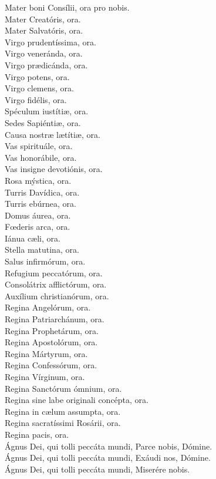 \documentclass[10pt,a4paper,oneside]{book}
\begin{document}
\begin{minipage}[t]{0.475\textwidth}
    Mater boni Consílii, ora pro nobis.\\
    Mater Creatóris, ora.\\
    Mater Salvatóris, ora.\\
    Virgo prudentíssima, ora.\\
    Virgo veneránda, ora.\\
    Virgo pr{\ae}dicánda, ora.\\
    Virgo potens, ora.\\
    Virgo clemens, ora.\\
    Virgo fidélis, ora.\\
    Spéculum iustíti{\ae}, ora.\\
    Sedes Sapiénti{\ae}, ora.\\
    Causa nostr{\ae} l{\ae}títi{\ae}, ora.\\
    Vas spirituále, ora.\\
    Vas honorábile, ora.\\
    Vas insigne devotiónis, ora.\\
    Rosa mýstica, ora.\\
    Turris Davídica, ora.\\
    Turris ebúrnea, ora.\\
    Domus áurea, ora.\\
    F{\oe}deris arca, ora.\\
    Iánua c{\ae}li, ora.\\
    Stella matutina, ora.\\
    Salus infirmórum, ora.\\
    Refugium peccatórum, ora.\\
    Consolátrix afflictórum, ora.\\
    Auxílium christianórum, ora.\\
    Regina Angelórum, ora.\\
    Regina Patriarchánum, ora.\\
    Regina Prophetárum, ora.\\
    Regina Apostolórum, ora.\\
    Regina Mártyrum, ora.\\
    Regina Confessórum, ora.\\
    Regina Vírginum, ora.\\
    Regina Sanctórum ómnium, ora.\\
    Regina sine labe originali concépta, ora.\\
    Regina in c{\ae}lum assumpta, ora.\\
    Regina sacratíssimi Rosárii, ora.\\
    Regina pacis, ora.\\
    Ágnus Dei, qui tolli peccáta mundi, Parce nobis, Dómine.\\
    Ágnus Dei, qui tolli peccáta mundi, Exáudi nos, Dómine.\\
    Ágnus Dei, qui tolli peccáta mundi, Miserére nobis.\\
    \orapronobissalve\\


\end{minipage}
\end{document}
